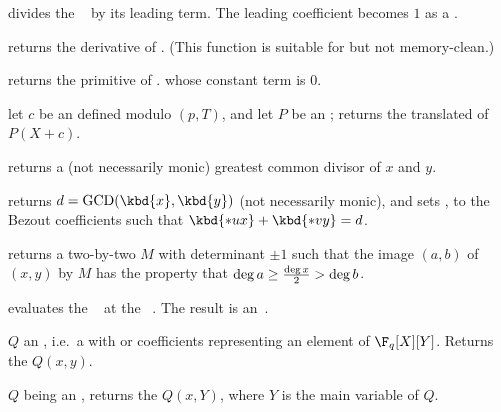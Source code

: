 
 divides the ~
by its leading term. The leading coefficient becomes $1$ as a .







 returns the derivative of .
(This function is suitable for  but not memory-clean.)

 returns the primitive of .
whose constant term is $0$.

 let $c$ be an 
defined modulo $(p, T)$, and let $P$ be an ; returns the translated
 of $P(X+c)$.

 returns a (not necessarily
monic) greatest common divisor of $x$  and $y$.

returns $d = \text{GCD}(\kbd{x},\kbd{y})$ (not necessarily monic), and sets
,  to the Bezout coefficients such that $\kbd{*ux} +
\kbd{*vy} = d$.

 returns a two-by-two
 $M$ with determinant $\pm 1$ such that the image $(a,b)$ of $(x,y)$
by $M$ has the property that $\deg a \geq {\deg x \over 2} > \deg b$.

 evaluates the ~
at the ~. The result is an~.

 $Q$ an ,
i.e.~a  with  or  coefficients representing an
element of $\F_q[X][Y]$. Returns the  $Q(x,y)$.

 $Q$ being an ,
returns the  $Q(x,Y)$, where $Y$ is the main variable of $Q$.


